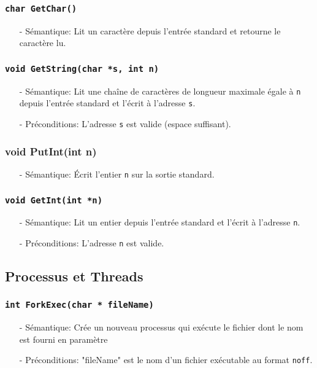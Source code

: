\documentclass[11pt]{article}
\theoremstyle{definition}
\theoremstyle{definition}
\begin{document}
\subsubsection{\texttt{char GetChar()}}
\begin{itemize}
\item[-] Sémantique: Lit un caractère depuis l'entrée standard et retourne le caractère lu.
\end{itemize}

\subsubsection{\texttt{void GetString(char *s, int n)}}
\begin{itemize}
\item[-] Sémantique:
  Lit une chaîne de caractères de longueur maximale égale à \texttt{n} depuis l'entrée standard et
  l'écrit à l'adresse \texttt{s}.
\item[-] Préconditions: L'adresse \texttt{s} est valide (espace suffisant).
\end{itemize}

\subsubsection{void PutInt(int n)}
\begin{itemize}
\item[-] Sémantique: Écrit l'entier \texttt{n} sur la sortie standard.
\end{itemize}

\subsubsection{\texttt{void GetInt(int *n)}}
\begin{itemize}
\item[-] Sémantique: Lit un entier depuis l'entrée standard et l'écrit à l'adresse \texttt{n}.
\item[-] Préconditions: L'adresse \texttt{n} est valide.
\end{itemize}

\subsection{Processus et Threads}

\subsubsection{\texttt{int ForkExec(char * fileName)}}
 \begin{itemize}
 \item[-] Sémantique: Crée un nouveau processus qui exécute le fichier dont le nom est fourni en paramètre
\item[-] Préconditions: "fileName" est le nom d'un fichier exécutable au format \texttt{noff}.
 \end{itemize}
\end{document}
